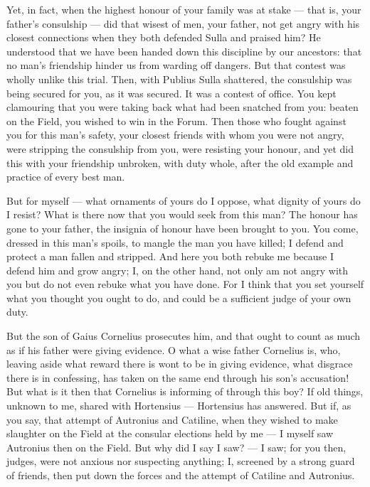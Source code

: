  Yet, in fact, when the highest honour of your family was at stake --- that is, your father's consulship --- did that wisest of men, your father, not get angry with his closest connections when they both defended Sulla and praised him? He understood that we have been handed down this discipline by our ancestors: that no man's friendship hinder us from warding off dangers. But that contest was wholly unlike this trial. Then, with Publius Sulla shattered, the consulship was being secured for you, as it was secured. It was a contest of office. You kept clamouring that you were taking back what had been snatched from you: beaten on the Field, you wished to win in the Forum. Then those who fought against you for this man's safety, your closest friends with whom you were not angry, were stripping the consulship from you, were resisting your honour, and yet did this with your friendship unbroken, with duty whole, after the old example and practice of every best man.

 But for myself --- what ornaments of yours do I oppose, what dignity of yours do I resist? What is there now that you would seek from this man? The honour has gone to your father, the insignia of honour have been brought to you. You come, dressed in this man's spoils, to mangle the man you have killed; I defend and protect a man fallen and stripped. And here you both rebuke me because I defend him and grow angry; I, on the other hand, not only am not angry with you but do not even rebuke what you have done. For I think that you set yourself what you thought you ought to do, and could be a sufficient judge of your own duty.

 But the son of Gaius Cornelius prosecutes him, and that ought to count as much as if his father were giving evidence. O what a wise father Cornelius is, who, leaving aside what reward there is wont to be in giving evidence, what disgrace there is in confessing, has taken on the same end through his son's accusation! But what is it then that Cornelius is informing of through this boy? If old things, unknown to me, shared with Hortensius --- Hortensius has answered. But if, as you say, that attempt of Autronius and Catiline, when they wished to make slaughter on the Field at the consular elections held by me --- I myself saw Autronius then on the Field. But why did I say I saw? --- I saw; for you then, judges, were not anxious nor suspecting anything; I, screened by a strong guard of friends, then put down the forces and the attempt of Catiline and Autronius.

